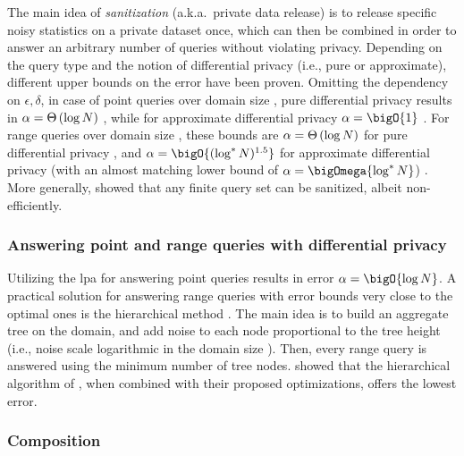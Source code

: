 		The main idea of \emph{sanitization} (a.k.a.\ private data release) is to release specific noisy statistics on a private dataset once, which can then be combined in order to answer an arbitrary number of queries without violating privacy.
		Depending on the query type and the notion of differential privacy (i.e., pure or approximate), different upper bounds on the error have been proven.
		Omitting the dependency on $\epsilon,\delta$, in case of point queries over domain size \domainSize{}, pure differential privacy results in $\alpha = \Theta \left( \log N \right)$ \cite{bounds-on-sample-complexity}, while for approximate differential privacy $\alpha = \bigO{1}$ \cite{private-learning-and-sanitization}.
		For range queries over domain size \domainSize{}, these bounds are $\alpha = \Theta \left( \log N \right)$ for pure differential privacy \cite{non-interactive-database-privacy,dp-under-observation}, and $\alpha = \bigO{(\log^{*} \domainSize)^{1.5}}$ for approximate differential privacy (with an almost matching lower bound of $\alpha = \bigOmega{\log^{*} \domainSize}$) \cite{private-learning-and-sanitization, dp-release, privately-learning-thresholds}.
		More generally, \textcite{non-interactive-database-privacy} showed that any finite query set \querySet{} can be sanitized, albeit non-efficiently.


		\subsubsection*{Answering point and range queries with differential privacy}

			Utilizing the \acrshort{lpa} for answering point queries results in error $\alpha = \bigO{\log \domainSize}$.
			A practical solution for answering range queries with error bounds very close to the optimal ones is the hierarchical method \cite{dp-under-observation, accuracy-dp-histograms, dp-wavelet}.
			The main idea is to build an aggregate tree on the domain, and add noise to each node proportional to the tree height (i.e., noise scale logarithmic in the domain size \domainSize{}).
			Then, every range query is answered using the minimum number of tree nodes.
			\textcite{hierarchical-methods-for-dp} showed that the hierarchical algorithm of \textcite{accuracy-dp-histograms}, when combined with their proposed optimizations, offers the lowest error.

		\subsubsection*{Composition}

